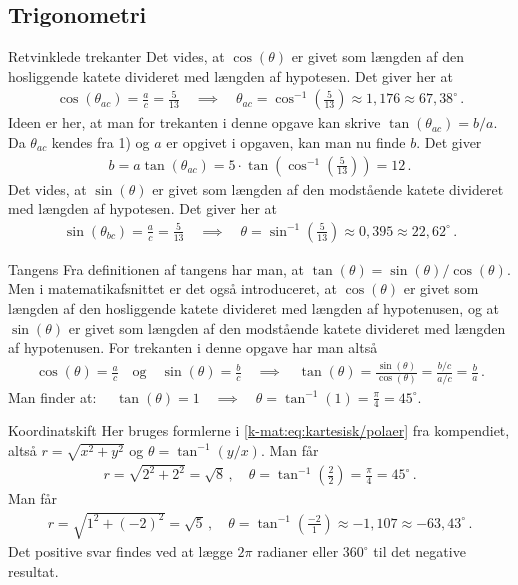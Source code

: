 \subsection*{Trigonometri}
\begin{opgave}[1]{Retvinklede trekanter}
\opg Det vides, at $\cos(\theta)$ er givet som længden af den hosliggende katete divideret med længden af hypotesen. Det giver her at
\begin{align*}
\cos(\theta_{ac}) = \frac{a}{c} = \frac{5}{13} \quad \implies \quad \theta_{ac} = \cos^{-1} \left( \frac{5}{13} \right) \approx 1,176  \approx 67,38^\circ \, .
\end{align*}
\opg Ideen er her, at man for trekanten i denne opgave kan skrive $\tan(\theta_{ac}) = b/a$. Da $\theta_{ac}$ kendes fra 1) og $a$ er opgivet i opgaven, kan man nu finde $b$. Det giver
\begin{align*}
b = a \tan(\theta_{ac}) = 5 \cdot \tan \left( \cos^{-1} \left( \frac{5}{13}  \right) \right) = 12 \, .
\end{align*}
\opg Det vides, at $\sin(\theta)$ er givet som længden af den modstående katete divideret med længden af hypotesen. Det giver her at
\begin{align*}
\sin(\theta_{bc}) = \frac{a}{c} = \frac{5}{13} \quad \implies \quad \theta = \sin^{-1} \left( \frac{5}{13} \right) \approx 0,395 \approx 22,62 ^\circ \, . 
\end{align*}
\end{opgave}
\begin{opgave}[1]{Tangens}
\opg Fra definitionen af tangens har man, at $\tan(\theta) = \sin(\theta)/\cos(\theta)$. Men i matematikafsnittet er det også introduceret, at $\cos(\theta)$ er givet som længden af den hosliggende katete divideret med længden af hypotenusen, og at $\sin(\theta)$ er givet som længden af den modstående katete divideret med længden af hypotenusen. For trekanten i denne opgave har man altså 
\begin{align*}
\cos(\theta) = \frac{a}{c} \quad \text{og} \quad \sin(\theta) = \frac{b}{c}  \quad \implies  \quad \tan(\theta) = \frac{\sin(\theta)}{\cos(\theta)} = \frac{b/c}{a/c} = \frac{b}{a} \, . 
\end{align*}
\opg Man finder at: $\quad \tan(\theta) = 1 \quad \implies \quad \theta =  \tan^{-1}(1) = \frac{\pi}{4} = 45^\circ$.
\end{opgave}
\begin{opgave}[1]{Koordinatskift}
Her bruges formlerne i \cref{k-mat:eq:kartesisk/polaer} fra kompendiet, altså $r = \sqrt{x^2 + y^2}$ og $\theta = \tan^{-1}\left(y/x\right)$.
\opg Man får
\begin{align*}
r = \sqrt{2^2+2^2} = \sqrt{8} \, , \quad \theta = \tan^{-1} \left( \frac{2}{2} \right) = \frac{\pi}{4} = 45 ^\circ \, .
\end{align*} 
\opg Man får
\begin{align*}
r = \sqrt{1^2 + (-2)^2} = \sqrt{5} \, , \quad \theta = \tan^{-1} \left( \frac{-2}{1} \right) \approx -1,107 \approx -63,43^\circ \, .
\end{align*}
Det positive svar findes ved at lægge $2\pi$ radianer eller $360^\circ$ til det negative resultat.
\end{opgave}
